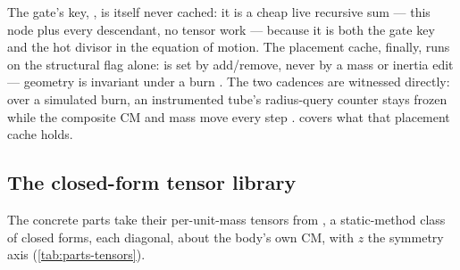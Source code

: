 The gate's key, , is itself never cached: it is a cheap live
recursive sum --- this node plus every descendant, no tensor work
 --- because it is both the gate key and the hot divisor in
the equation of motion. The placement cache, finally, runs on
the structural flag alone:  is set by add/remove, never by a mass or
inertia edit --- geometry is invariant under a burn . The two
cadences are witnessed directly: over a simulated burn, an instrumented tube's
radius-query counter stays frozen while the composite CM and mass move every step
.  covers what that
placement cache holds.

\subsection{The closed-form tensor library}\label{sec:parts-tensors}

The concrete parts take their per-unit-mass tensors from , a
static-method class of closed forms, each diagonal, about the body's own CM, with $z$ the
symmetry axis  (\cref{tab:parts-tensors}).

